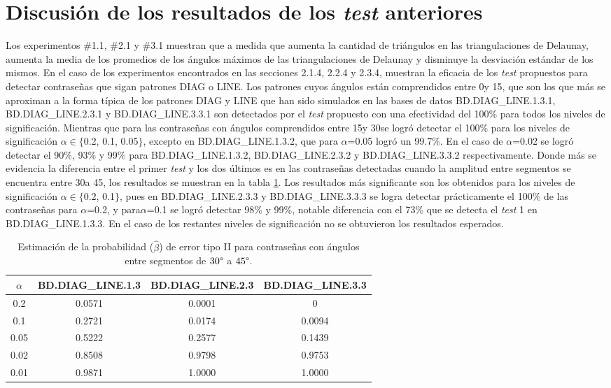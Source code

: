 \documentclass[12pt]{report}
\begin{document}
\section{Discusión de los resultados de los \textit{test} anteriores}
Los experimentos \#1.1, \#2.1 y \#3.1 muestran que a medida que aumenta la cantidad de triángulos en las triangulaciones de Delaunay, aumenta la media de los promedios de los ángulos máximos de las triangulaciones de Delaunay y disminuye la desviación estándar de los mismos. En el caso de los experimentos encontrados en las secciones 2.1.4, 2.2.4 y 2.3.4, muestran la eficacia de los \textit{test} propuestos  para detectar contraseñas que sigan patrones DIAG o LINE. Los patrones cuyos ángulos están comprendidos entre 0\degree y 15\degree, que son los que más se aproximan a la forma típica de los patrones DIAG y LINE que han sido simulados en las bases de datos BD.DIAG\_LINE.1.3.1, BD.DIAG\_LINE.2.3.1 y BD.DIAG\_LINE.3.3.1 son detectados por el \textit{test} propuesto con una efectividad del 100\% para todos los niveles de significación. Mientras que para las contraseñas con ángulos comprendidos entre 15\degree y 30\degree se logró detectar el 100\% para los niveles de significación $\alpha \in \{$0.2, 0.1, 0.05$\}$, excepto en BD.DIAG\_LINE.1.3.2, que para $\alpha$=0.05 logró un 99.7\%. En el caso de $\alpha$=0.02 se logró detectar el 90\%, 93\% y 99\% para BD.DIAG\_LINE.1.3.2, BD.DIAG\_LINE.2.3.2 y BD.DIAG\_LINE.3.3.2 respectivamente. Donde más se evidencia la diferencia entre  el primer \textit{test} y los dos últimos es en las contraseñas detectadas cuando la amplitud entre segmentos se encuentra entre 30\degree a 45\degree, los resultados se muestran en la tabla \ref{tab:error2-30-45}. Los resultados más significante son los obtenidos para los niveles de significación $\alpha \in \{$0.2, 0.1$\}$, pues en   BD.DIAG\_LINE.2.3.3 y BD.DIAG\_LINE.3.3.3  se logra detectar prácticamente el 100\% de las contraseñas para $\alpha$=0.2, y para$\alpha$=0.1 se logró detectar 98\% y 99\%, notable diferencia con el 73\% que se detecta el \textit{test} 1 en BD.DIAG\_LINE.1.3.3. En el caso de los restantes niveles de significación no se obtuvieron los resultados esperados.
\begin{table}[h!]
	\centering
	\begin{tabular}{|c|ccc|}
		\hline
		$\alpha$& BD.DIAG\_LINE.1.3 & BD.DIAG\_LINE.2.3 & BD.DIAG\_LINE.3.3  \\
		\hline
		0.2 & 0.0571     & 0.0001     & 0     \\
		0.1 & 0.2721      & 0.0174    & 0.0094     \\
		0.05& 0.5222    & 0.2577  & 0.1439     \\
		0.02& 0.8508     & 0.9798    & 0.9753     \\
		0.01& 0.9871     & 1.0000     & 1.0000     \\
		\hline
	\end{tabular}
	\caption{Estimación de la probabilidad ($\hat{\beta}$) de error tipo II para contraseñas con ángulos entre segmentos de $30\degree$ a $45\degree$.}
	\label{tab:error2-30-45}
\end{table}
\end{document}
